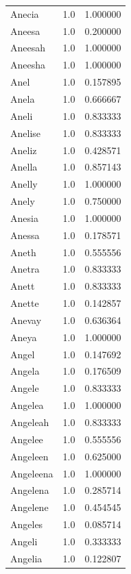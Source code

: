 \documentclass[
  letterpaper,
  DIV=11,
  numbers=noendperiod]{scrreprt}
\begin{document}
\begin{tabular}{lrr}
Anecia          &   1.0 &   1.000000 \\
Aneesa          &   1.0 &   0.200000 \\
Aneesah         &   1.0 &   1.000000 \\
Aneesha         &   1.0 &   1.000000 \\
Anel            &   1.0 &   0.157895 \\
Anela           &   1.0 &   0.666667 \\
Aneli           &   1.0 &   0.833333 \\
Anelise         &   1.0 &   0.833333 \\
Aneliz          &   1.0 &   0.428571 \\
Anella          &   1.0 &   0.857143 \\
Anelly          &   1.0 &   1.000000 \\
Anely           &   1.0 &   0.750000 \\
Anesia          &   1.0 &   1.000000 \\
Anessa          &   1.0 &   0.178571 \\
Aneth           &   1.0 &   0.555556 \\
Anetra          &   1.0 &   0.833333 \\
Anett           &   1.0 &   0.833333 \\
Anette          &   1.0 &   0.142857 \\
Anevay          &   1.0 &   0.636364 \\
Aneya           &   1.0 &   1.000000 \\
Angel           &   1.0 &   0.147692 \\
Angela          &   1.0 &   0.176509 \\
Angele          &   1.0 &   0.833333 \\
Angelea         &   1.0 &   1.000000 \\
Angeleah        &   1.0 &   0.833333 \\
Angelee         &   1.0 &   0.555556 \\
Angeleen        &   1.0 &   0.625000 \\
Angeleena       &   1.0 &   1.000000 \\
Angelena        &   1.0 &   0.285714 \\
Angelene        &   1.0 &   0.454545 \\
Angeles         &   1.0 &   0.085714 \\
Angeli          &   1.0 &   0.333333 \\
Angelia         &   1.0 &   0.122807 \\

\end{tabular}
\end{document}
